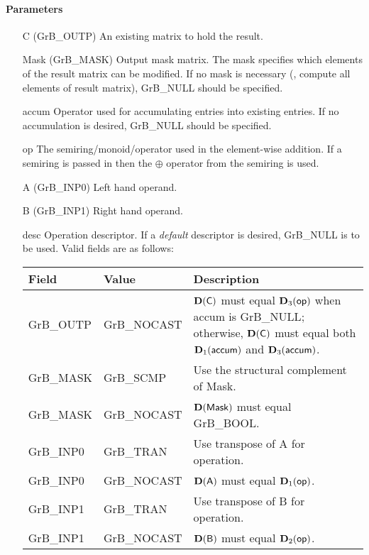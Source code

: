 \paragraph{Parameters}

\begin{itemize}[leftmargin=1.1in]
    \item[{\sf C}]     ({\sf GrB\_OUTP}) An existing matrix to hold the result.

    \item[{\sf Mask}] ({\sf GrB\_MASK}) Output mask matrix. The mask
    specifies which elements of the result matrix can be modified.
    If no mask is necessary (\ie, compute all elements of result
    matrix), {\sf GrB\_NULL} should be specified.

    \item[{\sf accum}]  Operator used for accumulating entries into existing
                         entries. If no accumulation is desired,
                        {\sf GrB\_NULL} should be specified.

    \item[{\sf op}]    The semiring/monoid/operator used in the element-wise addition.
                       If a semiring is passed in then the $\oplus$ operator from
                                    the semiring is used.
    \item[{\sf A}]     ({\sf GrB\_INP0}) Left hand operand.
    \item[{\sf B}]     ({\sf GrB\_INP1}) Right hand operand.
    
    \item[{\sf desc}]  Operation descriptor. If a
    \emph{default} descriptor is desired, {\sf GrB\_NULL} is to be
    used. Valid fields are as follows: \\
    \begin{tabular}{llp{3in}}
        Field  & Value & Description \\
        \hline
        {\sf GrB\_OUTP} & {\sf GrB\_NOCAST} & $\bold{D}({\sf C})$ must equal $\bold{D}_3({\sf op})$
                                              when {\sf accum} is {\sf GrB\_NULL}; otherwise, 
                                              $\bold{D}({\sf C})$ must equal both 
                                              $\bold{D}_1({\sf accum})$ and $\bold{D}_3({\sf accum})$. \\
        {\sf GrB\_MASK} & {\sf GrB\_SCMP}   & Use the structural complement of {\sf Mask}. \\
        {\sf GrB\_MASK} & {\sf GrB\_NOCAST} & $\bold{D}({\sf Mask})$ must equal {\sf GrB\_BOOL}. \\
        {\sf GrB\_INP0} & {\sf GrB\_TRAN}   & Use transpose of {\sf A} for operation. \\
        {\sf GrB\_INP0} & {\sf GrB\_NOCAST} & $\bold{D}({\sf A})$ must equal $\bold{D}_1({\sf op})$. \\
        {\sf GrB\_INP1} & {\sf GrB\_TRAN}   & Use transpose of {\sf B} for operation. \\
        {\sf GrB\_INP1} & {\sf GrB\_NOCAST} & $\bold{D}({\sf B})$ must equal $\bold{D}_2({\sf op})$. \\
    \end{tabular}
\end{itemize}

